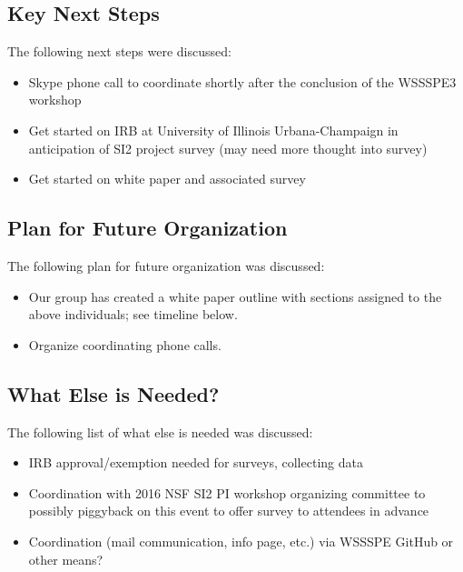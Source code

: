 \subsection{Key Next Steps}

The following next steps were discussed:
%
\begin{itemize}
\item
Skype phone call to coordinate shortly after the conclusion of the WSSSPE3 workshop

\item
Get started on IRB at University of Illinois Urbana-Champaign in anticipation of
SI2 project survey (may need more thought into survey)

\item
Get started on white paper and associated survey

\end{itemize}



\subsection{Plan for Future Organization}

The following plan for future organization was discussed:
%
\begin{itemize}
\item
Our group has created a white paper outline with sections assigned to the above
individuals; see timeline below. %

\item
Organize coordinating phone calls.

\end{itemize}




\subsection{What Else is Needed?}

The following list of what else is needed was discussed:

\begin{itemize}
\item
IRB approval/exemption needed for surveys, collecting data

\item
Coordination with 2016 NSF SI2 PI workshop organizing committee to possibly
piggyback on this event to offer survey to attendees in advance

\item
Coordination (mail communication, info page, etc.) via WSSSPE GitHub or other
means?

\end{itemize}




